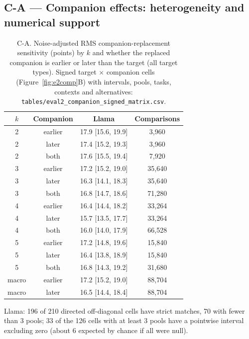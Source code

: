 \documentclass{article}
\begin{document}
\subsection*{C-A --- Companion effects: heterogeneity and numerical support}
\begin{table}[h]
\centering\scriptsize
\caption{C-A. Noise-adjusted RMS companion-replacement sensitivity (points) by $k$ and whether the replaced companion is earlier or later than the target (all target types). Signed target $\times$ companion cells (Figure~\ref{fig:e2comp}B) with intervals, pools, tasks, contexts and alternatives: \texttt{tables/eval2\_companion\_signed\_matrix.csv}.}
\label{tab:CA}
\begin{tabular}{cccc}
\toprule
$k$ & Companion & Llama & Comparisons \\
\midrule
2 & earlier & 17.9 [15.6, 19.9] & 3,960 \\
2 & later & 17.4 [15.2, 19.3] & 3,960 \\
2 & both & 17.6 [15.5, 19.4] & 7,920 \\
3 & earlier & 17.2 [15.2, 19.0] & 35,640 \\
3 & later & 16.3 [14.1, 18.3] & 35,640 \\
3 & both & 16.8 [14.7, 18.6] & 71,280 \\
4 & earlier & 16.4 [14.4, 18.2] & 33,264 \\
4 & later & 15.7 [13.5, 17.7] & 33,264 \\
4 & both & 16.0 [14.0, 17.9] & 66,528 \\
5 & earlier & 17.2 [14.8, 19.6] & 15,840 \\
5 & later & 16.4 [13.8, 18.9] & 15,840 \\
5 & both & 16.8 [14.3, 19.2] & 31,680 \\
macro & earlier & 17.2 [15.2, 19.0] & 88,704 \\
macro & later & 16.5 [14.4, 18.4] & 88,704 \\
\bottomrule
\end{tabular}
\end{table}

Llama: 196 of 210 directed off-diagonal cells have strict matches, 70 with fewer than 3 pools; 33 of the 126 cells with at least 3 pools have a pointwise interval excluding zero (about 6 expected by chance if all were null).
\end{document}
